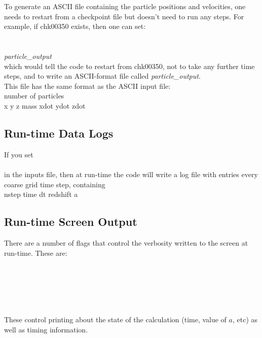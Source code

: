 To generate an ASCII file containing the particle positions and velocities, 
one needs to restart from a checkpoint
file but doesn't need to run any steps.  For example, if chk00350 exists, then one can set: \\

 \\
 \\
 {\em particle\_output} \\

\noindent which would tell the code to restart from chk00350, not to take any further time steps, and to write an ASCII-format 
file called {\em particle\_output}. \\

\noindent This file has the same format as the ASCII input file: \\

\noindent number of particles \\ 
x y z mass xdot ydot zdot \\

\subsection{Run-time Data Logs}

If you set \\

  \\

\noindent in the inputs file, then at run-time the code will write a log file with entries every coarse
grid time step, containing \\

\noindent nstep  time   dt   redshift   a


\subsection{Run-time Screen Output}

There are a number of flags that control the verbosity written to the screen at run-time.  These are:

 \\
 \\
 \\
 \\
 \\

These control printing  about the state of the calculation (time, value of $a$, etc) as well as
timing information.
